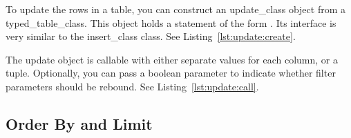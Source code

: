 To update the rows in a table, you can construct an \gls{update_class} object from a \gls{typed_table_class}. This object holds a statement of the form \newline{}. Its interface is very similar to the \gls{insert_class} class. See Listing~\ref{lst:update:create}.



The update object is callable with either separate values for each column, or a tuple. Optionally, you can pass a boolean parameter to indicate whether filter parameters should be rebound. See Listing~\ref{lst:update:call}.



\subsection{Order By and Limit}
